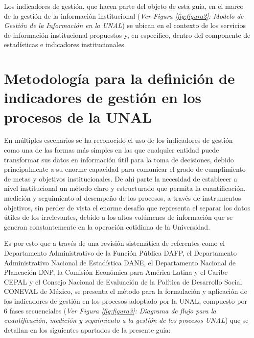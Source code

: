 \documentclass[
]{book}
\begin{document}
Los indicadores de gestión, que hacen parte del objeto de esta guía, en el marco de la gestión de la información institucional (\emph{Ver Figura \ref{fig:figura2}: Modelo de Gestión de la Información en la UNAL}) se ubican en el contexto de los servicios de información institucional propuestos y, en específico, dentro del componente de estadísticas e indicadores institucionales.

\hypertarget{metodologuxeda-para-la-definiciuxf3n-de-indicadores-de-gestiuxf3n-en-los-procesos-de-la-unal}{%
\chapter{Metodología para la definición de indicadores de gestión en los procesos de la UNAL}\label{metodologuxeda-para-la-definiciuxf3n-de-indicadores-de-gestiuxf3n-en-los-procesos-de-la-unal}}

En múltiples escenarios se ha reconocido el uso de los indicadores de gestión como una de las formas más simples en las que cualquier entidad puede transformar sus datos en información útil para la toma de decisiones, debido principalmente a su enorme capacidad para comunicar el grado de cumplimiento de metas y objetivos institucionales. De ahí parte la necesidad de establecer a nivel institucional un método claro y estructurado que permita la cuantificación, medición y seguimiento al desempeño de los procesos, a través de instrumentos objetivos, sin perder de vista el enorme desafío que representa el separar los datos útiles de los irrelevantes, debido a los altos volúmenes de información que se generan constantemente en la operación cotidiana de la Universidad.

Es por esto que a través de una revisión sistemática de referentes como el Departamento Administrativo de la Función Pública DAFP, el Departamento Administrativo Nacional de Estadística DANE, el Departamento Nacional de Planeación DNP, la Comisión Económica para América Latina y el Caribe CEPAL y el Consejo Nacional de Evaluación de la Política de Desarrollo Social CONEVAL de México, se presenta el método para la formulación y aplicación de los indicadores de gestión en los procesos adoptado por la UNAL, compuesto por 6 fases secuenciales (\emph{Ver Figura \ref{fig:figura3}: Diagrama de flujo para la cuantificación, medición y seguimiento a la gestión de los procesos UNAL}) que se detallan en los siguientes apartados de la presente guía:
\end{document}
